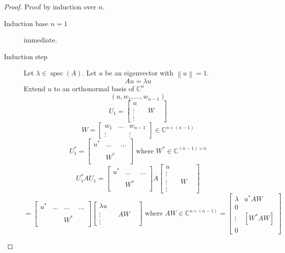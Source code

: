 \documentclass[a4paper]{article}
\numberwithin{lecref}{section}
\newcommand{\norm}[1]{\left\|#1\right\|}
\begin{document}
\begin{proof}
  Proof by induction over $n$.
  \begin{description}
    \item[Induction base $n=1$] immediate.
    \item[Induction step]
      Let $\lambda \in \operatorname{spec}(A)$. Let $u$ be an eigenvector with $\norm{u} = 1$.
      \[ Au = \lambda u \]
      Extend $u$ to an orthonormal basis of $\mathbb C^n$
      \[ (u, w_1, \dots, w_{n-1}) \]
      \[ U_1 = \begin{bmatrix} u & & & \\ \vdots & & W & \\ \vdots & & & \end{bmatrix} \]
      \[ W = \begin{bmatrix} w_1 & \dots & w_{n-1} \\ \vdots &  & \vdots \end{bmatrix} \in \mathbb C^{n \times (n-1)} \]
      \[ U_1^* = \begin{bmatrix} u^* & \dots & \dots \\ & & \\ & W^* & \\ & & \end{bmatrix} \text{ where } W^* \in \mathbb C^{(n-1) \times n} \]
      \[ U_1^* AU_1 = \begin{bmatrix} u^* & \dots & \dots \\ & & \\ & W^* & \\ & & \end{bmatrix} A \begin{bmatrix} u & & & \\ \vdots & & & \\ \vdots & & W & \\ \vdots & & & \end{bmatrix} \]
      \[ = \begin{bmatrix} u^* & \dots & \dots & \dots \\ & & & \\ & & W^* & \\ & & & \end{bmatrix} \begin{bmatrix} \lambda u & & & \\ \vdots & & AW & \\ \vdots & & & \end{bmatrix} \text{ where } AW \in \mathbb C^{n \times (n-1)} = \begin{bmatrix} \lambda & u^* AW \\ 0 & \\ \vdots & [W^* AW] \\ 0 & \end{bmatrix} \]

\end{description}
\end{proof}
\end{document}
